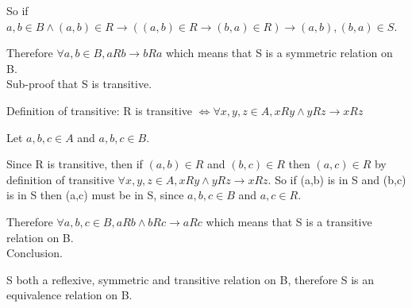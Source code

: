 \documentclass[a4paper,11pt]{article}
\begin{document}
So if $a,b \in B \land (a,b) \in R \to ((a,b) \in R \to (b,a) \in R) \to (a,b),(b,a) \in S$.

Therefore $\forall a, b \in B, a R b \to b R a$ which means that S is a symmetric relation on B.\\

\noindent Sub-proof that S is transitive.

Definition of transitive: R is transitive $\iff \forall x, y, z \in A, x R y \land y R z \to x R z$

Let $a,b,c \in A$ and $a,b,c \in B$.

Since R is transitive, then if $(a,b) \in R$ and $(b,c) \in R$ then $(a,c) \in R$ by definition of transitive $\forall x, y, z \in A, x R y \land y R z \to x R z $. So if (a,b) is in S and (b,c) is in S then (a,c) must be in S, since $a,b,c \in B$ and $a,c \in R$.

Therefore $\forall a,b,c \in B, a R b \land b R c \to a R c$ which means that S is a transitive relation on B.\\

\noindent Conclusion.

S both a reflexive, symmetric and transitive relation on B, therefore S is an equivalence relation on B.
\end{document}
